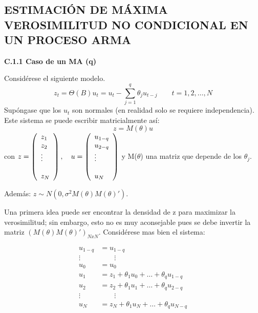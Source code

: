 \chapter{}
\section{ESTIMACI\'{O}N DE M\'{A}XIMA VEROSIMILITUD NO CONDICIONAL EN UN PROCESO ARMA}
\textbf{C.1.1 Caso de un MA (q)}

Consid\'{e}rese el siguiente modelo.
\[
z_{t} =\Theta (B)u_{t} =u_{t} -\sum_{j=1}^q \theta_{j} u_{t-j} \qquad t=1,2,\ldots,N
\]
Sup\'{o}ngase que los $u_{t}$ son normales (en realidad solo se requiere independencia). Este sistema se puede escribir matricialmente as\'{i}:
\[
z=M(\theta)u
\]
 con $z=\left( {{\begin{array}{*{20}c}
 {z_{1} } \hfill \\
 {z_{2} } \hfill \\
 \vdots \hfill \\
 \hfill \\
 {z_{N} } \hfill \\
\end{array} }} \right),\quad u=\left( {{\begin{array}{*{20}c}
 {u_{1-q} } \hfill \\
 {u_{2-q} } \hfill \\
 \vdots \hfill \\
 \hfill \\
 {u_{N} } \hfill \\
\end{array} }} \right)$ y M($\theta$) una matriz que depende de los $\theta_{j}$.\newline

Adem\'{a}s: $z \sim N(0,\sigma^{2}M(\theta)M(\theta)')$.\newline

Una primera idea puede ser encontrar la densidad de z para maximizar la verosimilitud; sin embargo, esto no es muy aconsejable pues se debe invertir la matriz $(M(\theta)M(\theta)')_{NxN}$. Consid\'{e}rese mas bien el sistema:

\begin{align*}
u_{1-q} &= u_{1-q}\\ 
\vdots & \qquad \vdots\\
u_{0} &= u_{0}\\
u_{1} &= z_{1}+\theta_{1}u_{0}+\ldots+\theta_{q}u_{1-q}\\
u_{2} &= z_{2}+\theta_{1}u_{1}+\ldots+\theta_{q}u_{2-q}\\
\vdots & \qquad \vdots\\
u_{N} &= z_{N}+\theta_{1}u_{N}+\ldots+\theta_{q}u_{N-q}\\
\end{align*}

